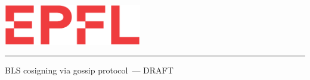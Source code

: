 
%        




\newcommand{\logoepfl}[0]{
  \begin{center}
    \includegraphics[width=6cm]{logo_epfl_coul.eps}
  \end{center}
  \vspace{0.3cm}
  \hrule
}
\newcommand{\project}[1]{
  \begin{center}
    \large{#1}
  \end{center}
  \vspace{1cm}
}
\newcommand{\department}[1]{
  \begin{center}
    \large{#1}
  \end{center}
}
\newcommand{\lab}[1]{
  \begin{center}
    \large{#1}
  \end{center}
}
\newcommand{\supervisor}[3]{
  \begin{center}
    \begin{normalsize}{
        \bf #1}\\#2\\#3
    \end{normalsize}
  \end{center}
}
\renewcommand{\author}[1]{
  \begin{center}
    \Large{#1}
  \end{center}
  \vspace{0.5cm}
}
\renewcommand{\title}[1]{
  \vspace{3cm}
  \begin{center}
    \huge{#1}
  \end{center}
  \vspace{1.7cm}
}
\renewcommand{\date}[2]{
  \begin{center}
    \normalsize{#1 #2}
  \end{center}
  \vspace{0.5cm}
}


\thispagestyle{empty}


  \logoepfl

  \title{BLS cosigning via gossip protocol~--- DRAFT}

